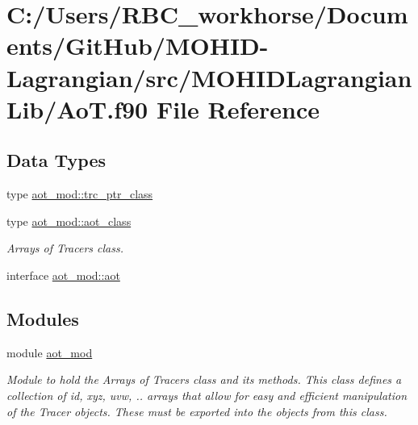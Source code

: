 \hypertarget{_ao_t_8f90}{}\section{C\+:/\+Users/\+R\+B\+C\+\_\+workhorse/\+Documents/\+Git\+Hub/\+M\+O\+H\+I\+D-\/\+Lagrangian/src/\+M\+O\+H\+I\+D\+Lagrangian\+Lib/\+AoT.f90 File Reference}
\label{_ao_t_8f90}
\subsection*{Data Types}
\begin{DoxyCompactItemize}
\item 
type \mbox{\hyperlink{structaot__mod_1_1trc__ptr__class}{aot\+\_\+mod\+::trc\+\_\+ptr\+\_\+class}}
\item 
type \mbox{\hyperlink{structaot__mod_1_1aot__class}{aot\+\_\+mod\+::aot\+\_\+class}}
\begin{DoxyCompactList}\small\item\em Arrays of Tracers class. \end{DoxyCompactList}\item 
interface \mbox{\hyperlink{interfaceaot__mod_1_1aot}{aot\+\_\+mod\+::aot}}
\end{DoxyCompactItemize}
\subsection*{Modules}
\begin{DoxyCompactItemize}
\item 
module \mbox{\hyperlink{namespaceaot__mod}{aot\+\_\+mod}}
\begin{DoxyCompactList}\small\item\em Module to hold the Arrays of Tracers class and its methods. This class defines a collection of id, xyz, uvw, .. arrays that allow for easy and efficient manipulation of the Tracer objects. These must be exported into the objects from this class. \end{DoxyCompactList}\end{DoxyCompactItemize}
